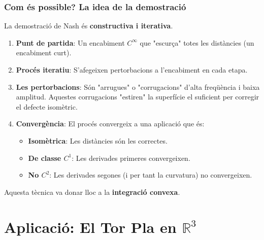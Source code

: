 \documentclass{beamer}
\begin{document}
\begin{frame}
  \frametitle{Com és possible? La idea de la demostració}
  
  La demostració de Nash és \textbf{constructiva i iterativa}. 
  
  \begin{enumerate}
    \item \textbf{Punt de partida}: Un encabiment $C^\infty$ que "escurça" totes les distàncies (un encabiment curt). 
    
    \item \textbf{Procés iteratiu}: S'afegeixen pertorbacions a l'encabiment en cada etapa.
    
    \item \textbf{Les pertorbacions}: Són "arrugues" o "corrugacions" d'alta freqüència i baixa amplitud.  Aquestes corrugacions "estiren" la superfície el suficient per corregir el defecte isomètric.
    
    \item \textbf{Convergència}: El procés convergeix a una aplicació que és:
    \begin{itemize}
        \item \textbf{Isomètrica}: Les distàncies són les correctes.
        \item \textbf{De classe $C^1$}: Les derivades primeres convergeixen.
        \item \textbf{No $C^2$}: Les derivades segones (i per tant la curvatura) no convergeixen. 
    \end{itemize}
  \end{enumerate}
  
  Aquesta tècnica va donar lloc a la \textbf{integració convexa}. 
\end{frame}

\section{Aplicació: El Tor Pla en $\mathbb{R}^3$}
\end{document}
